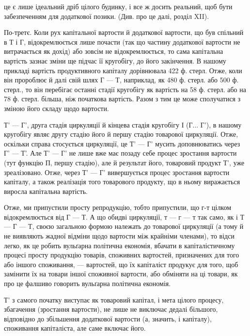 \parcont{}  %
це є лише ідеальний дріб цілого будинку, і все ж досить реальний, щоб
бути забезпеченням для додаткової позики. (Див. про це далі, розділ XII).

По-третє. Коли рух капітальної вартости й додаткової вартости, що
був спільний в Т і Г, відокремлюється лише почасти (так що частину
додаткової вартости не витрачається як дохід) або зовсім не відокремлюється,
то сама капітальна вартість зазнає зміни ще підчас її кругобігу,
до його закінчення. В нашому прикладі вартість продуктивного капіталу
дорівнювала 422 ф. стерл. Отже, коли він пророблює й далі свій шлях
Г — Т, наприклад, як 480 ф. стерл. або 500 ф. стерл., то він перебігає
останні стадії кругобігу як вартість на 58 ф. стерл. або на 78 ф. стерл.
більша, ніж початкова вартість. Разом з тим це може сполучатися з зміною
його складу щодо вартости.

Т' — Г', друга стадія циркуляції й кінцева стадія кругобігу І (Г... Г'),
в нашому кругобігу являє другу стадію його й першу стадію товарової
циркуляції. Отже, оскільки справа стосується циркуляції, це Т' — Г' мусить
доповнюватись через Г' — Т'. Але Т' — Г' не лише вже має позаду себе процес
зростання вартости (тут функцію П, першу стадію), але й результат його,
товаровий продукт Т', уже зреалізовано. Отже, через Т' — Г' вивершується
процес зростання вартости капіталу, а також реалізація того товарового продукту,
що в ньому виражається виросла капітальна вартість.

Отже, ми припустили просту репродукцію, тобто припустили, що
г-т цілком відокремлюється від Г — Т. А що обидві циркуляції,
т — г — т так само, як і Т — Г — Т, своєю загальною формою належать
до товарової циркуляції (а тому й не виявляють жадної відміни щодо
вартости між крайніми членами), то відси легко, як це робить вульґарна
політична економія, вбачати в капіталістичному процесі просту
продукцію товарів, споживних вартостей, призначених для того або іншого
споживання, — вартостей, що їх капіталіст продукує для того, щоб замінити
їх на товари іншої споживної вартости, або обміняти на ці товари, як
про це фалшиво говорить вульґарна політична економія.

Т' з самого початку виступає як товаровий капітал, і мета цілого
процесу, збагачення (зростання вартости), не лише не виключає дедалі
більшого, відповідно до збільшення додаткової вартости (а, значить, і
капіталу), споживання капіталіста, але саме включає його.

